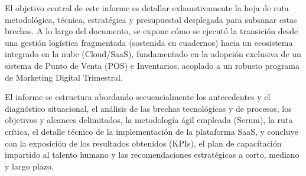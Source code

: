 El objetivo central de este informe es detallar exhaustivamente la hoja de ruta metodológica, técnica, estratégica y presupuestal desplegada para subsanar estas brechas. A lo largo del documento, se expone cómo se ejecutó la transición desde una gestión logística fragmentada (sostenida en cuadernos) hacia un ecosistema integrado en la nube (Cloud/SaaS), fundamentado en la adopción exclusiva de un sistema de Punto de Venta (POS) e Inventarios, acoplado a un robusto programa de Marketing Digital Trimestral. 

El informe se estructura abordando secuencialmente los antecedentes y el diagnóstico situacional, el análisis de las brechas tecnológicas y de procesos, los objetivos y alcances delimitados, la metodología ágil empleada (Scrum), la ruta crítica, el detalle técnico de la implementación de la plataforma SaaS, y concluye con la exposición de los resultados obtenidos (KPIs), el plan de capacitación impartido al talento humano y las recomendaciones estratégicas a corto, mediano y largo plazo.
